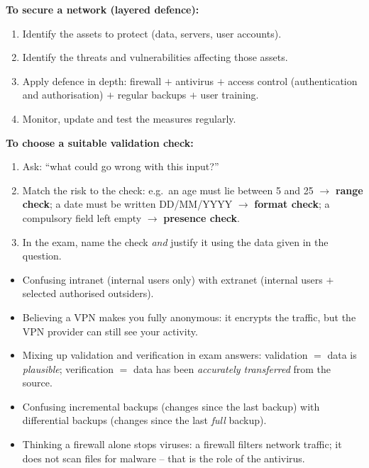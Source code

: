 \documentclass[11pt]{article}
\begin{document}
\begin{methode}
\textbf{To secure a network (layered defence):}
\begin{enumerate}
  \item Identify the assets to protect (data, servers, user accounts).
  \item Identify the threats and vulnerabilities affecting those assets.
  \item Apply defence in depth: firewall $+$ antivirus $+$ access control (authentication and authorisation) $+$ regular backups $+$ user training.
  \item Monitor, update and test the measures regularly.
\end{enumerate}
\textbf{To choose a suitable validation check:}
\begin{enumerate}
  \item Ask: ``what could go wrong with this input?''
  \item Match the risk to the check: e.g.\ an age must lie between 5 and 25 $\rightarrow$ \textbf{range check}; a date must be written DD/MM/YYYY $\rightarrow$ \textbf{format check}; a compulsory field left empty $\rightarrow$ \textbf{presence check}.
  \item In the exam, name the check \emph{and} justify it using the data given in the question.
\end{enumerate}
\end{methode}

\begin{attention}
\begin{itemize}
  \item Confusing intranet (internal users only) with extranet (internal users $+$ selected authorised outsiders).
  \item Believing a VPN makes you fully anonymous: it encrypts the traffic, but the VPN provider can still see your activity.
  \item Mixing up validation and verification in exam answers: validation $=$ data is \emph{plausible}; verification $=$ data has been \emph{accurately transferred} from the source.
  \item Confusing incremental backups (changes since the last backup) with differential backups (changes since the last \emph{full} backup).
  \item Thinking a firewall alone stops viruses: a firewall filters network traffic; it does not scan files for malware -- that is the role of the antivirus.
\end{itemize}
\end{attention}
\end{document}

